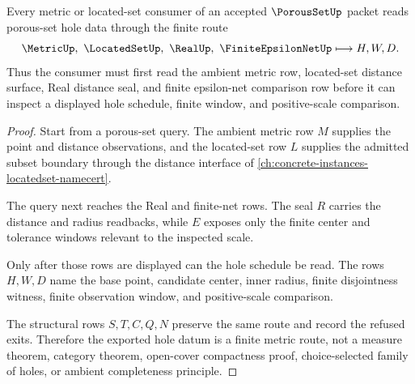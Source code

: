 \begin{theorem}
\label{thm:porous-set-metric-hole-route}
Every metric or located-set consumer of an accepted $\PorousSetUp$ packet reads porous-set hole data through the finite route
$$
\MetricUp,\ \LocatedSetUp,\ \RealUp,\ \FiniteEpsilonNetUp
\longmapsto
H,W,D .
$$
Thus the consumer must first read the ambient metric row, located-set distance surface, Real distance seal, and finite epsilon-net comparison row before it can inspect a displayed hole schedule, finite window, and positive-scale comparison.
\end{theorem}
\begin{proof}
Start from a porous-set query. The ambient metric row $M$ supplies the point and distance observations, and the located-set row $L$ supplies the admitted subset boundary through the distance interface of \autoref{ch:concrete-instances-locatedset-namecert}.

The query next reaches the Real and finite-net rows. The seal $R$ carries the distance and radius readbacks, while $E$ exposes only the finite center and tolerance windows relevant to the inspected scale.

Only after those rows are displayed can the hole schedule be read. The rows $H,W,D$ name the base point, candidate center, inner radius, finite disjointness witness, finite observation window, and positive-scale comparison.

The structural rows $S,T,C,Q,N$ preserve the same route and record the refused exits. Therefore the exported hole datum is a finite metric route, not a measure theorem, category theorem, open-cover compactness proof, choice-selected family of holes, or ambient completeness principle.
\end{proof}

